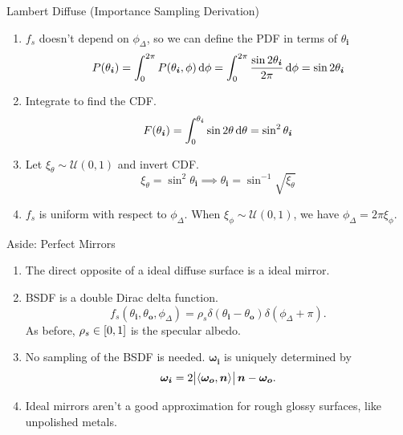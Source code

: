 \documentclass[10pt]{beamer}
\DeclarePairedDelimiter\ip{\langle }{\rangle}
\begin{document}
\begin{frame}{Lambert Diffuse (Importance Sampling Derivation)}
  \begin{enumerate}
  \item \(f_s\) doesn't depend on \(\phi_\Delta\), so we can define the PDF in terms of \(\theta_{\bm i}\)
    \[P(\theta_{\bm i}) = \int_0^{2\pi} P(\theta_{\bm i}, \phi)\dif \phi = \int_0^{2\pi} \frac{\sin 2\theta_{\bm i}}{2\pi} \dif \phi = \sin 2\theta_{\bm i}\]
  \item Integrate to find the CDF.
    \[F(\theta_{\bm i}) = \int_0^{\theta_{\bm i}} \sin 2\theta \dif \theta = \sin^2 \theta_{\bm i}\]
  \item Let \(\xi_\theta \sim \mathcal{U}(0, 1)\) and invert CDF.
    \[\xi_\theta = \sin^2 \theta_{\bm i} \implies \theta_{\bm i} = \sin^{-1}\sqrt{\xi_\theta}\]
  \item \(f_s\) is uniform with respect to \(\phi_\Delta\). When \(\xi_\phi \sim \mathcal{U}(0, 1)\), we have \(\phi_\Delta = 2\pi\xi_\phi\).
  \end{enumerate}
\end{frame}

\begin{frame}{Aside: Perfect Mirrors}
  \begin{enumerate}
  \item The direct opposite of a ideal diffuse surface is a ideal mirror.
  \item BSDF is a double Dirac delta function.
    \[f_s(\theta_{\bm i}, \theta_{\bm o}, \phi_\Delta) = \rho_s \delta(\theta_{\bm i} - \theta_{\bm o})\delta(\phi_\Delta + \pi).\]
    As before, \(\rho_s \in \intcc{0, 1}\) is the specular albedo.
  \item No sampling of the BSDF is needed. \(\bm{\omega_i}\) is uniquely determined by
    \[\bm{\omega_i} = 2\abs{\ip{\bm{\omega_o}, \bm n}}\bm n-  \bm{\omega_o}.\]
  \item Ideal mirrors aren't a good approximation for rough glossy surfaces, like unpolished metals.
  \end{enumerate}
\end{frame}
\end{document}
